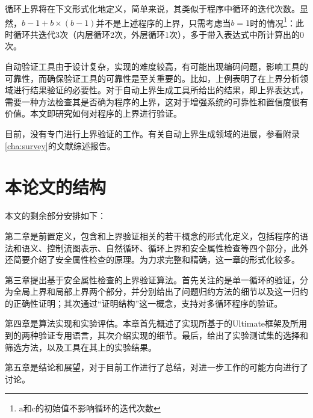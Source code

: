 
循环上界将在下文形式化地定义，简单来说，其类似于程序中循环的迭代次数。显然，$b - 1 + b \times (b - 1)$并不是上述程序的上界，只需考虑当$b=1$时的情况\footnote{a和c的初始值不影响循环的迭代次数}：此时循环共迭代3次（内层循环2次，外层循环1次），多于带入表达式中所计算出的0次。

自动验证工具由于设计复杂，实现的难度较高，有可能出现编码问题，影响工具的可靠性，而确保验证工具的可靠性是至关重要的。比如，上例表明了在上界分析领域进行结果验证的必要性。对于自动上界生成工具所给出的结果，即上界表达式，需要一种方法检查其是否确为程序的上界，这对于增强系统的可靠性和置信度很有价值。本文即研究如何对程序的上界进行验证。

目前，没有专门进行上界验证的工作。有关自动上界生成领域的进展，参看附录\ref{cha:survey}的文献综述报告。

\section{本论文的结构}

本文的剩余部分安排如下：

第二章是前置定义，包含和上界验证相关的若干概念的形式化定义，包括程序的语法和语义、控制流图表示、自然循环、循环上界和安全属性检查等四个部分，此外还简要介绍了安全属性检查的原理。为力求完整和精确，这一章的形式化较多。

第三章提出基于安全属性检查的上界验证算法。首先关注的是单一循环的验证，分为全局上界和局部上界两个部分，并分别给出了问题归约方法的细节以及这一归约的正确性证明；其次通过“证明结构”这一概念，支持对多循环程序的验证。

第四章是算法实现和实验评估。本章首先概述了实现所基于的Ultimate框架及所用到的两种验证专用语言，其次介绍实现的细节。最后，给出了实验测试集的选择和筛选方法，以及工具在其上的实验结果。

第五章是结论和展望，对于目前工作进行了总结，对进一步工作的可能方向进行了讨论。

